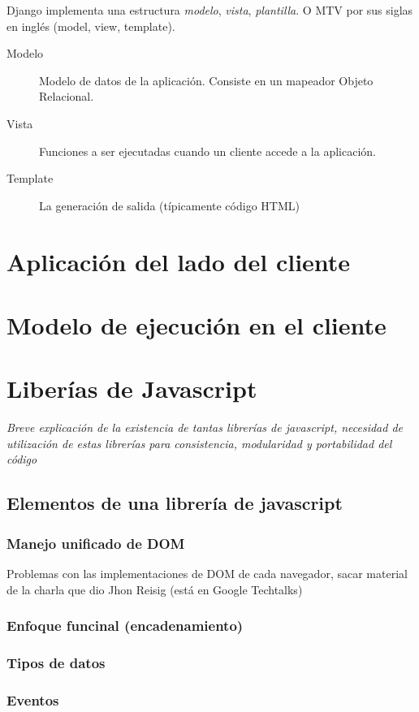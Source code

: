 \documentclass[a4paper]{report}
\begin{document}
Django implementa una estructura \emph{modelo}, \emph{vista}, \emph{plantilla}.
O MTV por sus siglas en inglés (model, view, template).
\begin{description}
\item[Modelo] Modelo de datos de la aplicación. Consiste en un mapeador Objeto
Relacional.
\item[Vista] Funciones a ser ejecutadas cuando un cliente accede a la
aplicación.
\item[Template] La generación de salida (típicamente código HTML)
\end{description}

\section{Aplicación del lado del cliente}
\section{Modelo de ejecución en el cliente}
\section{Liberías de Javascript}
\emph{Breve explicación de la existencia de tantas librerías de javascript,
necesidad de utilización de estas librerías para consistencia, modularidad y
portabilidad del código}
\subsection{Elementos de una librería de javascript}


\subsubsection{Manejo unificado de DOM}
Problemas con las implementaciones de DOM de cada navegador, sacar material de
la charla que dio Jhon Reisig (está en Google Techtalks)


\subsubsection{Enfoque funcinal (encadenamiento) }
\subsubsection{Tipos de datos}
\subsubsection{Eventos}
\end{document}
